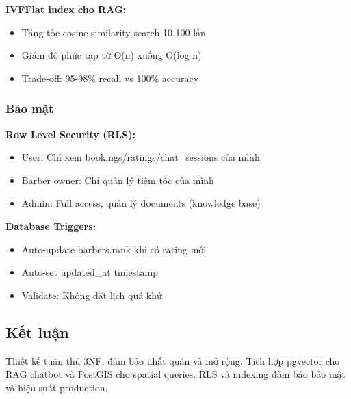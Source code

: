 \textbf{IVFFlat index cho RAG:}
\begin{itemize}
    \item Tăng tốc cosine similarity search 10-100 lần
    \item Giảm độ phức tạp từ O(n) xuống O(log n)
    \item Trade-off: 95-98\% recall vs 100\% accuracy
\end{itemize}

\subsubsection{Bảo mật}

\textbf{Row Level Security (RLS):}
\begin{itemize}
    \item User: Chỉ xem bookings/ratings/chat\_sessions của mình
    \item Barber owner: Chỉ quản lý tiệm tóc của mình
    \item Admin: Full access, quản lý documents (knowledge base)
\end{itemize}

\textbf{Database Triggers:}
\begin{itemize}
    \item Auto-update barbers.rank khi có rating mới
    \item Auto-set updated\_at timestamp
    \item Validate: Không đặt lịch quá khứ
\end{itemize}

\subsection{Kết luận}

Thiết kế tuân thủ 3NF, đảm bảo nhất quán và mở rộng. 
Tích hợp pgvector cho RAG chatbot và PostGIS cho spatial queries. 
RLS và indexing đảm bảo bảo mật và hiệu suất production.